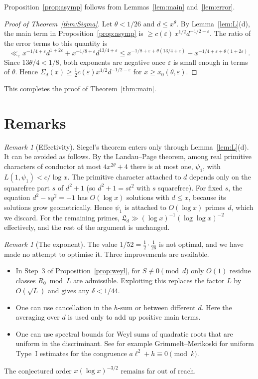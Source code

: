 \documentclass[11pt]{amsart}
\theoremstyle{remark}
\newtheorem{remark}[theorem]{Remark}
\theoremstyle{definition}
\numberwithin{equation}{section}
\newcommand{\eps}{\varepsilon}
\newcommand{\Lf}{\mathfrak{L}}
\begin{document}
Proposition~\ref{prop:asymp} follows from Lemmas~\ref{lem:main} and~\ref{lem:error}.

\begin{proof}[Proof of Theorem~\ref{thm:Sigma}]
Let $\theta<1/26$ and $d\le x^{\theta}$. By Lemma~\ref{lem:L}(d), the main term in Proposition~\ref{prop:asymp} is $\ge c(\eps)\,x^{1/2}d^{-1/2-\eps}$. The ratio of the error terms to this quantity is
\[
\ll_\eps x^{-1/4+\eps}d^{1+2\eps}+x^{-1/8+\eps}d^{13/4+\eps}\le x^{-1/8+\eps+\theta(13/4+\eps)}+x^{-1/4+\eps+\theta(1+2\eps)}.
\]
Since $13\theta/4<1/8$, both exponents are negative once $\eps$ is small enough in terms of $\theta$. Hence $\Sigma_d(x)\ge\frac12c(\eps)x^{1/2}d^{-1/2-\eps}$ for $x\ge x_0(\theta,\eps)$.
\end{proof}

This completes the proof of Theorem~\ref{thm:main}.

\section{Remarks}

\begin{remark}[Effectivity]\label{rem:effective}
Siegel's theorem enters only through Lemma~\ref{lem:L}(d). It can be avoided as follows. By the Landau--Page theorem, among real primitive characters of conductor at most $4x^{2\theta}+4$ there is at most one, $\psi_1$, with $L(1,\psi_1)<c/\log x$. The primitive character attached to $d$ depends only on the squarefree part $s$ of $d^2+1$ (so $d^2+1=st^2$ with $s$ squarefree). For fixed $s$, the equation $d^2-sy^2=-1$ has $O(\log x)$ solutions with $d\le x$, because its solutions grow geometrically. Hence $\psi_1$ is attached to $O(\log x)$ primes $d$, which we discard. For the remaining primes, $\Lf_d\gg(\log x)^{-1}(\log\log x)^{-2}$ effectively, and the rest of the argument is unchanged.
\end{remark}

\begin{remark}[The exponent]
The value $1/52=\frac12\cdot\frac1{26}$ is not optimal, and we have made no attempt to optimise it. Three improvements are available.
\begin{itemize}
\item In Step~3 of Proposition~\ref{prop:weyl}, for $S\not\equiv0\pmod d$ only $O(1)$ residue classes $R_0\bmod L$ are admissible. Exploiting this replaces the factor $L$ by $O(\sqrt L)$ and gives any $\delta<1/44$.
\item One can use cancellation in the $h$-sum or between different $d$. Here the averaging over $d$ is used only to add up positive main terms.
\item One can use spectral bounds for Weyl sums of quadratic roots that are uniform in the discriminant. See for example Grimmelt--Merikoski \cite{GM} for uniform Type~I estimates for the congruence $a\ell^2+h\equiv 0\pmod k$.
\end{itemize}
The conjectured order $x(\log x)^{-3/2}$ remains far out of reach.
\end{remark}
\end{document}
